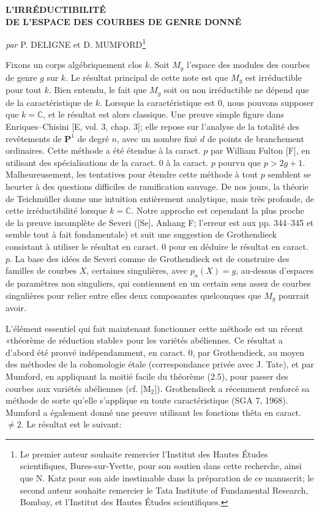 \documentclass[10pt]{article}
\newcommand{\pa}{p_a}
\newcommand{\PP}{\mathbf P}
\begin{document}
\begin{center}
{\Large\bfseries L'IRRÉDUCTIBILITÉ\\[0.3em]
DE L'ESPACE DES COURBES DE GENRE DONNÉ}\par
\vspace{0.8em}
{\itshape par} P. DELIGNE et D. MUMFORD\footnote{Le premier auteur souhaite remercier l'Institut des Hautes Études scientifiques, Bures-sur-Yvette, pour son soutien dans cette recherche, ainsi que N. Katz pour son aide inestimable dans la préparation de ce manuscrit; le second auteur souhaite remercier le Tata Institute of Fundamental Research, Bombay, et l'Institut des Hautes Études scientifiques.}
\end{center}

Fixons un corps algébriquement clos $k$. Soit $M_g$ l'espace des modules des courbes de genre $g$ sur $k$. Le résultat principal de cette note est que $M_g$ est irréductible pour tout $k$. Bien entendu, le fait que $M_g$ soit ou non irréductible ne dépend que de la caractéristique de $k$. Lorsque la caractéristique est 0, nous pouvons supposer que $k=\mathbb C$, et le résultat est alors classique. Une preuve simple figure dans Enriques--Chisini [E, vol. 3, chap. 3]; elle repose sur l'analyse de la totalité des revêtements de $\PP^1$ de degré $n$, avec un nombre fixé $d$ de points de branchement ordinaires. Cette méthode a été étendue à la caract. $p$ par William Fulton [F], en utilisant des spécialisations de la caract. 0 à la caract. $p$ pourvu que $p>2g+1$. Malheureusement, les tentatives pour étendre cette méthode à tout $p$ semblent se heurter à des questions difficiles de ramification sauvage. De nos jours, la théorie de Teichmüller donne une intuition entièrement analytique, mais très profonde, de cette irréductibilité lorsque $k=\mathbb C$. Notre approche est cependant la plus proche de la preuve incomplète de Severi ([Se], Anhang F; l'erreur est aux pp. 344--345 et semble tout à fait fondamentale) et suit une suggestion de Grothendieck consistant à utiliser le résultat en caract. 0 pour en déduire le résultat en caract. $p$. La base des idées de Severi comme de Grothendieck est de construire des familles de courbes $X$, certaines singulières, avec $\pa(X)=g$, au-dessus d'espaces de paramètres non singuliers, qui contiennent en un certain sens assez de courbes singulières pour relier entre elles deux composantes quelconques que $M_g$ pourrait avoir.

L'élément essentiel qui fait maintenant fonctionner cette méthode est un récent «théorème de réduction stable» pour les variétés abéliennes. Ce résultat a d'abord été prouvé indépendamment, en caract. 0, par Grothendieck, au moyen des méthodes de la cohomologie étale (correspondance privée avec J. Tate), et par Mumford, en appliquant la moitié facile du théorème (2.5), pour passer des courbes aux variétés abéliennes (cf. [M$_2$]). Grothendieck a récemment renforcé sa méthode de sorte qu'elle s'applique en toute caractéristique (SGA 7, 1968). Mumford a également donné une preuve utilisant les fonctions thêta en caract. $\ne 2$. Le résultat est le suivant:
\end{document}
